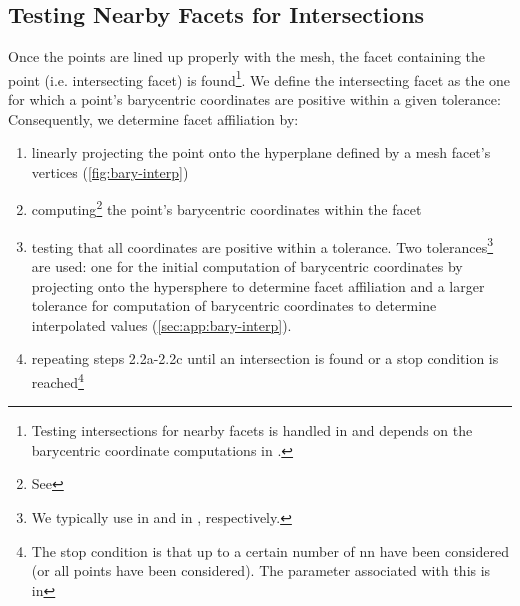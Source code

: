 \documentclass[final,12pt]{elsarticle}
\begin{document}
\subsection{Testing Nearby Facets for Intersections}
\label{sec:app:bary:int:facets}
Once the \outpt{} points are lined up properly with the mesh, the facet containing the \outpt{} point (i.e. intersecting facet) is found\footnote{Testing intersections for nearby facets is handled in  and depends on the barycentric coordinate computations in .}. We define the intersecting facet as the one for which a point's barycentric coordinates are positive within a given tolerance:
Consequently, we determine facet affiliation by:
\begin{enumerate}%
	\item[2.2a] linearly projecting the \outpt{} point onto the hyperplane defined by a mesh facet's vertices (\cref{fig:bary-interp})
	\item[2.2b] computing\footnote{See } the point's barycentric coordinates within the facet \cite{anatoliyCheckIfRay2015,skalaRobustBarycentricCoordinates2013}
	\item[2.2c] testing that all coordinates are positive \cite{langerSphericalBarycentricCoordinates2006} within a tolerance. Two tolerances\footnote{We typically use  in  and  in , respectively. } are used: one for the initial computation of barycentric coordinates by projecting onto the hypersphere to determine facet affiliation and a larger tolerance for computation of barycentric coordinates to determine interpolated values (\cref{sec:app:bary-interp}).
	\item[2.2d] repeating steps 2.2a-2.2c until an intersection is found or a stop condition is reached\footnote{The stop condition is that up to a certain number of \gls{nn} have been considered (or all points have been considered). The parameter associated with this is  in  }
\end{enumerate}
\end{document}
